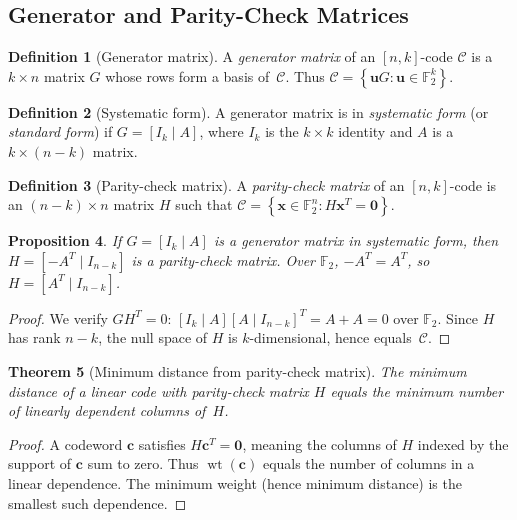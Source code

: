 \documentclass[12pt,a4paper,openany]{book}
\theoremstyle{definition}
\newtheorem{definition}{Definition}[chapter]
\theoremstyle{plain}
\newtheorem{theorem}[definition]{Theorem}
\newtheorem{proposition}[definition]{Proposition}
\theoremstyle{remark}
\newcommand{\set}[1]{\left\{#1\right\}}
\begin{document}
\subsection{Generator and Parity-Check Matrices}
\label{ssec:generator-parity}

\begin{definition}[Generator matrix]
\label{def:generator}
A \emph{generator matrix} of an $[n,k]$-code $\mathcal{C}$ is a
$k\times n$ matrix $G$ whose rows form a basis of~$\mathcal{C}$.
Thus $\mathcal{C}=\set{\mathbf{u}G:\mathbf{u}\in\mathbb{F}_2^k}$.
\end{definition}

\begin{definition}[Systematic form]
\label{def:systematic}
A generator matrix is in \emph{systematic form} (or \emph{standard
form}) if $G=[I_k\mid A]$, where $I_k$ is the $k\times k$ identity and
$A$ is a $k\times(n-k)$ matrix.
\end{definition}

\begin{definition}[Parity-check matrix]
\label{def:parity-check}
A \emph{parity-check matrix} of an $[n,k]$-code is an
$(n-k)\times n$ matrix $H$ such that
$\mathcal{C}=\set{\mathbf{x}\in\mathbb{F}_2^n:H\mathbf{x}^T=\mathbf{0}}$.
\end{definition}

\begin{proposition}
\label{prop:GH-relation}
If $G=[I_k\mid A]$ is a generator matrix in systematic form, then
$H=[-A^T\mid I_{n-k}]$ is a parity-check matrix.  Over $\mathbb{F}_2$,
$-A^T=A^T$, so $H=[A^T\mid I_{n-k}]$.
\end{proposition}

\begin{proof}
We verify $GH^T=0$: $[I_k\mid A][A\mid I_{n-k}]^T=A+A=0$
over $\mathbb{F}_2$.  Since $H$ has rank $n-k$, the null space of $H$
is $k$-dimensional, hence equals~$\mathcal{C}$.
\end{proof}

\begin{theorem}[Minimum distance from parity-check matrix]
\label{thm:min-dist-H}
The minimum distance of a linear code with parity-check matrix $H$
equals the minimum number of linearly dependent columns of~$H$.
\end{theorem}

\begin{proof}
A codeword $\mathbf{c}$ satisfies $H\mathbf{c}^T=\mathbf{0}$, meaning
the columns of $H$ indexed by the support of $\mathbf{c}$ sum to zero.
Thus $\operatorname{wt}(\mathbf{c})$ equals the number of columns in a
linear dependence.  The minimum weight (hence minimum distance) is the
smallest such dependence.
\end{proof}
\end{document}
